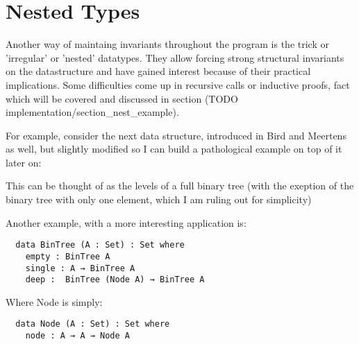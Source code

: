 \documentclass[12pt,twoside,notitlepage]{report}
\newcommand{\Conid}[1]{\mathit{#1}}
\newcommand{\Varid}[1]{\mathit{#1}}
\def\resethooks{%
  \global\let\SaveRestoreHook\empty
  \global\let\ColumnHook\empty}
\newcommand{\hsindent}[1]{\quad}%
\let\hspre\empty
\let\hspost\empty
\begin{document}
\section{Nested Types}

Another way of maintaing invariants throughout the program is the trick or 'irregular'
or 'nested' datatypes. They allow forcing strong structural invariants on the datastructure
and have gained interest because of their practical implications. \cite{birdmeertens}
Some difficulties come up in recursive calls or inductive proofs, fact which will be
covered and discussed in section (TODO implementation/section_nest_example).

For example, consider the next data structure, introduced in Bird and Meertens \cite{birdmeertens}
as well, but slightly modified so I can build a pathological example on top of it later on:

\resethooks

This can be thought of as the levels of a full binary tree (with the exeption of the binary tree with only
one element, which I am ruling out for simplicity)


Another example, with a more interesting application is:

\begin{verbatim}
  data BinTree (A : Set) : Set where
    empty : BinTree A
    single : A → BinTree A
    deep :  BinTree (Node A) → BinTree A
\end{verbatim}
Where Node is simply:
\begin{verbatim}
  data Node (A : Set) : Set where
    node : A → A → Node A
\end{verbatim}
\end{document}
